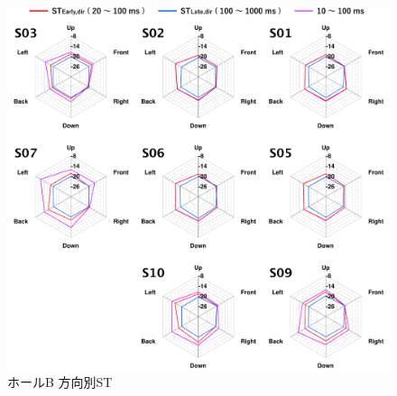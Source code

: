 \documentclass[11pt,a4j]{jreport}
\begin{document}
  \begin{figure}[H]
    \centering
    \includegraphics[scale=.75]{images/realHallDirSt/allPoint/reshaped/b.pdf}
    \caption*{ホールB 方向別ST}
  \end{figure}

  \newpage

  \vspace*{6\baselineskip}
\end{document}
